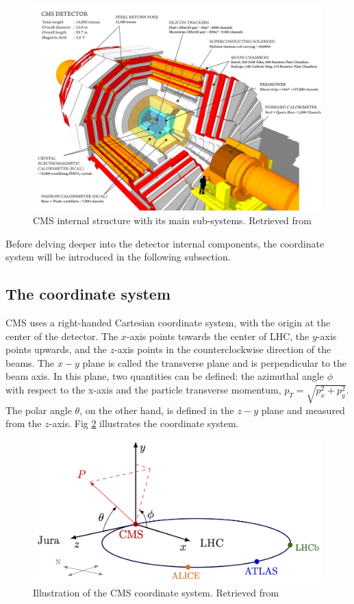 \begin{figure}[htp!]
	\centering
	\includegraphics[scale=0.2]{MainContent/Figs/cms_structure.png}
	\caption{CMS internal structure with its main sub-systems. Retrieved from }
	\label{fig:CMS_structure}
\end{figure}


Before delving deeper into the detector internal components, the coordinate system will be introduced in the following subsection.

\subsection{The coordinate system}
CMS uses a right-handed Cartesian coordinate system, with the origin at the center of the detector. The $x$-axis points towards the center of LHC, the $y$-axis points upwards, and the $z$-axis points in the counterclockwise direction of the beams. The $x-y$ plane is called the transverse plane and is perpendicular to the beam axis. In this plane, two quantities can be defined: the azimuthal angle $\phi$ with respect to the x-axis and the particle transverse momentum, $p_T = \sqrt{p_x^2 + p_y^2}$. The polar angle $\theta$, on the other hand, is defined in the $z-y$ plane and measured from the $z$-axis. Fig \ref{fig:cms_coordinate_system} illustrates the coordinate system.


\begin{figure}[htp!]
	\centering
	\includegraphics{MainContent/Figs/cms_coordinate_system.png}
	\caption{Illustration of the CMS coordinate system. Retrieved from }
	\label{fig:cms_coordinate_system}
\end{figure}

